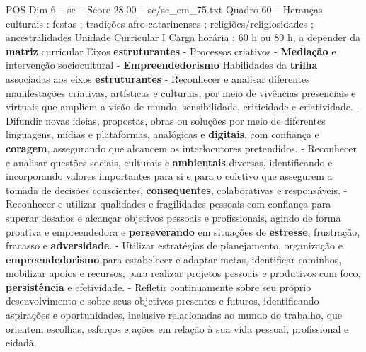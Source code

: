 \begin{textsample}{POS Dim 6 – sc – Score 28.00 – sc/sc\_em\_75.txt}
Quadro 60 – Heranças culturais : festas ; tradições afro-catarinenses ; religiões/religiosidades ; ancestralidades Unidade Curricular I Carga horária : 60 h ou 80 h, a depender da \textbf{matriz} curricular Eixos \textbf{estruturantes} - Processos criativos - \textbf{Mediação} e intervenção sociocultural - \textbf{Empreendedorismo} Habilidades da \textbf{trilha} associadas aos eixos \textbf{estruturantes} - Reconhecer e analisar diferentes manifestações criativas, artísticas e culturais, por meio de vivências presenciais e virtuais que ampliem a visão de mundo, sensibilidade, criticidade e criatividade. - Difundir novas ideias, propostas, obras ou soluções por meio de diferentes linguagens, mídias e plataformas, analógicas e \textbf{digitais}, com confiança e \textbf{coragem}, assegurando que alcancem os interlocutores pretendidos. - Reconhecer e analisar questões sociais, culturais e \textbf{ambientais} diversas, identificando e incorporando valores importantes para si e para o coletivo que assegurem a tomada de decisões conscientes, \textbf{consequentes}, colaborativas e responsáveis. - Reconhecer e utilizar qualidades e fragilidades pessoais com confiança para superar desafios e alcançar objetivos pessoais e profissionais, agindo de forma proativa e empreendedora e \textbf{perseverando} em situações de \textbf{estresse}, frustração, fracasso e \textbf{adversidade}. - Utilizar estratégias de planejamento, organização e \textbf{empreendedorismo} para estabelecer e adaptar metas, identificar caminhos, mobilizar apoios e recursos, para realizar projetos pessoais e produtivos com foco, \textbf{persistência} e efetividade. - Refletir continuamente sobre seu próprio desenvolvimento e sobre seus objetivos presentes e futuros, identificando aspirações e oportunidades, inclusive relacionadas ao mundo do trabalho, que orientem escolhas, esforços e ações em relação à sua vida pessoal, profissional e cidadã.

\end{textsample}

